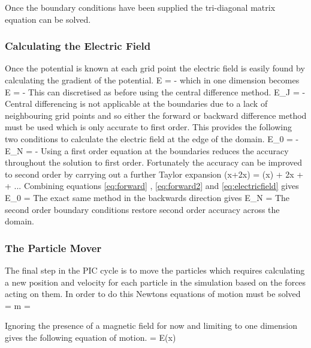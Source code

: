 Once the boundary conditions have been supplied the tri-diagonal matrix equation can be solved.
 

\subsubsection{Calculating the Electric Field}
Once the potential is known at each grid point the electric field is easily found by calculating the gradient of the potential.
\be 
E = - \nabla \psi
\ee 
which in one dimension becomes
\be 
E = - 
\label{eq:electricfield}
\ee
This can discretised as before using the central difference method. 
\be 
E_J = - 
\ee 
Central differencing is not applicable at the boundaries due to a lack of neighbouring grid points and so either the forward or backward difference method must be used which is only accurate to first order. This provides the following two conditions to calculate the electric field at the edge of the domain.
\be
E_0 = - 
\ee 
\be 
E_N = - 
\ee
Using a first order equation at the boundaries reduces the accuracy throughout the solution to first order. Fortunately the accuracy can be improved to second order by carrying out a further Taylor expansion 
\be
\psi(x+2\Delta x) = \psi(x) + 2\Delta x  +  + ...
\label{eq:forward2}
\ee
Combining equations \eqref{eq:forward} , \eqref{eq:forward2} and \eqref{eq:electricfield} gives 
\be 
E_0 = 
\ee 
The exact same method in the backwards direction gives 
\be 
E_N = 
\ee
The second order boundary conditions restore second order accuracy across the domain.
\subsubsection{The Particle Mover}
The final step in the PIC cycle is to move the particles which requires calculating a new position and velocity for each particle in the simulation based on the forces acting on them. In order to do this Newtons equations of motion must be solved 
\be 
{}  = m 
\ee 
\be 
{} = 
\label{eq:diff2}
\ee 

Ignoring the presence of a magnetic field for now and limiting to one dimension gives the following equation of motion.
\be 
{} =  E(x)
\label{eq:diff1}
\ee

